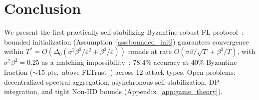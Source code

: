 \vspace{-10pt}
\section{Conclusion}
\label{sec:conclusion}

We present the first practically self-stabilizing Byzantine-robust FL
protocol~\cite{arora_gouda,dolev_kat_practical}: bounded initialization
(Assumption~\ref{ass:bounded_init}) guarantees convergence within
$T^*\!=\!O(\Delta_0(\sigma^2\beta^2/\varepsilon^2+\beta^2/\varepsilon))$ rounds at rate
$O(\sigma\beta/\sqrt{T}+\beta^2/T)$, with $\sigma^2\beta^2\!=\!0.25$ as a matching
impossibility~\cite{bbp_transition,byzantine_ml}; 78.4\% accuracy at 40\% Byzantine
fraction (${\sim}15$ pts.\ above FLTrust~\cite{crfl}) across 12 attack types.
Open problems: decentralized spectral aggregation, asynchronous self-stabilization,
DP integration, and tight Non-IID bounds (Appendix~\ref{app:game_theory}).
